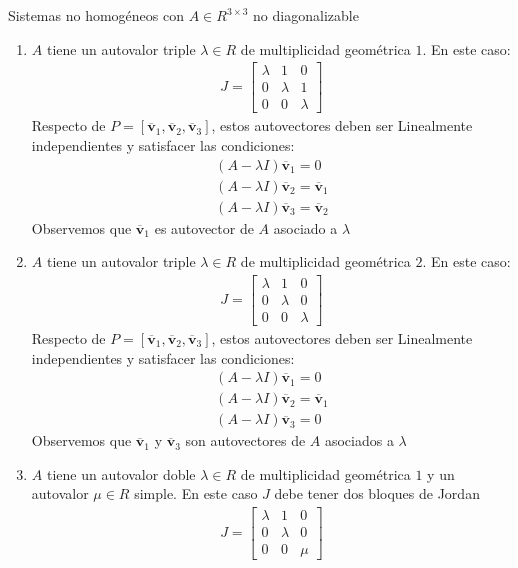 \documentclass[a4paper, twoside]{article}
\numberwithin{equation}{section}
\numberwithin{figure}{section}
\numberwithin{table}{section}
\newcommand{\vect}[1]{\overline{\textbf{#1}}}
\begin{document}
\begin{corolario*}{Sistemas no homogéneos con $A \in R^{3 \times 3}$ no diagonalizable}
	\begin{enumerate}
		\item $A$ tiene un autovalor triple $\lambda \in R$ de multiplicidad geométrica $1$. En este caso:
		\begin{align}
			J=\begin{bmatrix} {\lambda}&{1}&{0} \\ {0}&{\lambda}&{1} \\ {0}&{0}&{\lambda} \end{bmatrix}
		\end{align}
		Respecto de $P=[\vect{v}_1,\vect{v}_2,\vect{v}_3]$, estos autovectores deben ser Linealmente independientes y satisfacer las condiciones:
		\begin{align}
			\left( A-\lambda I \right)\vect{v}_1=0 \\
			\left( A-\lambda I \right)\vect{v}_2=\vect{v}_1 \\
			\left( A-\lambda I \right)\vect{v}_3=\vect{v}_2
		\end{align}
		Observemos que $\vect{v}_1$ es autovector de $A$ asociado a $\lambda$
		\item $A$ tiene un autovalor triple $\lambda \in R$ de multiplicidad geométrica $2$. En este caso:
		\begin{align}
		J=\begin{bmatrix} {\lambda}&{1}&{0} \\ {0}&{\lambda}&{0} \\ {0}&{0}&{\lambda} \end{bmatrix}
		\end{align}
		Respecto de $P=[\vect{v}_1,\vect{v}_2,\vect{v}_3]$, estos autovectores deben ser Linealmente independientes y satisfacer las condiciones:
		\begin{align}
			\left( A-\lambda I \right)\vect{v}_1=0 \\
			\left( A-\lambda I \right)\vect{v}_2=\vect{v}_1 \\
			\left( A-\lambda I \right)\vect{v}_3=0
		\end{align}
		Observemos que $\vect{v}_1$ y $\vect{v}_3$ son autovectores de $A$ asociados a $\lambda$
		\item $A$ tiene un autovalor doble $\lambda \in R$ de multiplicidad geométrica $1$ y un autovalor $\mu \in R$ simple. En este caso $J$ debe tener dos bloques de Jordan
		\begin{align}
			J=\begin{bmatrix} {\lambda}&{1}&{0} \\ {0}&{\lambda}&{0} \\ {0}&{0}&{\mu} \end{bmatrix}

\end{align}
\end{enumerate}
\end{corolario*}
\end{document}
